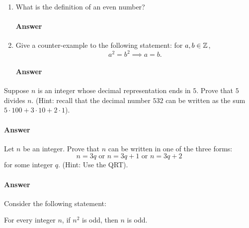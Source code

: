 \begin{enumerate}
    \item What is the definition of an even number?
        \paragraph{Answer}
        \todo{}

    \item Give a counter-example to the following statement: for $a,b \in {\mathbb Z}$,
        $$a^2=b^2 \implies a=b.$$
        \paragraph{Answer}
        \todo{}

\end{enumerate}

\collab{\todo{}}

Suppose $n$ is an integer whose decimal representation ends in $5$.  Prove that
$5$ divides $n$. (Hint: recall that the decimal number $532$ can be written as
the sum $5\cdot 100 + 3 \cdot 10 + 2 \cdot 1$).

\paragraph{Answer}
\todo{}

\collab{\todo{}}

Let $n$ be an integer.  Prove that $n$ can be written in one of the three forms:
$$
    n=3q
    \text{ or }
    n=3q+1
    \text{ or }
    n=3q+2
$$
for some integer $q$. (Hint: Use the QRT).

\paragraph{Answer}
\todo{}

\collab{\todo{}}

Consider the following statement:

For every integer $n$, if $n^2$ is odd, then
$n$ is odd.

